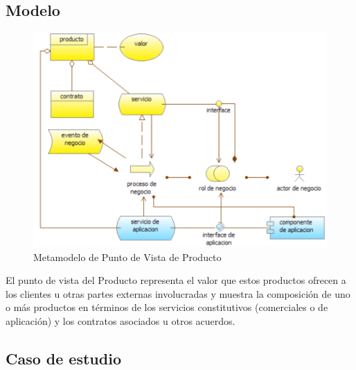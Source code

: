 \subsection{Modelo}
\begin{figure}[th!]
	\centering
	\includegraphics[width=0.5\linewidth]{arquitectura/imagenes/modeloProducto}
	\caption{Metamodelo de Punto de Vista de Producto\cite{pun6}}
	\label{fig:metamodelo de punto de vista de producto}
\end{figure}
El punto de vista del Producto representa el valor que estos productos ofrecen a los clientes u otras partes externas involucradas y muestra la composición de uno o más productos en términos de los servicios constitutivos (comerciales o de aplicación) y los contratos asociados u otros acuerdos.

\newpage

\subsection{Caso de estudio}

\newpage

